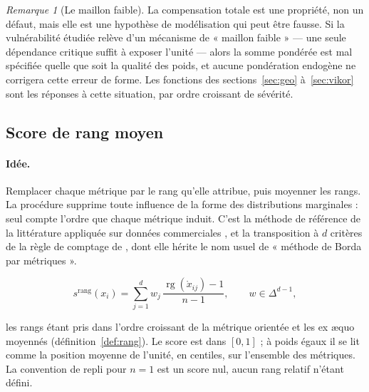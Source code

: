 \documentclass[11pt,a4paper]{article}
\theoremstyle{definition}
\theoremstyle{remark}
\newtheorem{remarque}{Remarque}[section]
\newcommand{\simplex}{\Delta^{d-1}}
\newcommand{\rg}{\operatorname{rg}}
\begin{document}
\begin{remarque}[Le maillon faible]
  \label{rem:maillon-faible}
  La compensation totale est une propriété, non un défaut, mais elle est une hypothèse
  de modélisation qui peut être fausse. Si la vulnérabilité étudiée relève d'un mécanisme
  de « maillon faible » --- une seule dépendance critique suffit à exposer l'unité ---
  alors la somme pondérée est mal spécifiée quelle que soit la qualité des poids, et
  aucune pondération endogène ne corrigera cette erreur de forme. Les fonctions des
  sections~\ref{sec:geo} à~\ref{sec:vikor} sont les réponses à cette situation, par ordre
  croissant de sévérité.
\end{remarque}

\bigskip

\subsection{Score de rang moyen}
\label{sec:rang-moyen}

\medskip

\paragraph{Idée.} Remplacer chaque métrique par le rang qu'elle attribue, puis moyenner
les rangs. La procédure supprime toute influence de la forme des distributions
marginales : seul compte l'ordre que chaque métrique induit. C'est la méthode de
référence de la littérature appliquée sur données commerciales
\citep{arjona2023}, et la transposition à $d$ critères de la règle de comptage de
\citet{borda1781}, dont elle hérite le nom usuel de « méthode de Borda par métriques ».

\medskip

\[
  s^{\mathrm{rang}}(x_i)
  = \sum_{j=1}^{d} w_j \, \frac{\rg(\mathring{x}_{ij}) - 1}{n - 1},
  \qquad w \in \simplex ,
\]

\bigskip

les rangs étant pris dans l'ordre croissant de la métrique orientée et les ex \ae quo
moyennés (définition~\ref{def:rang}). Le score est dans $[0,1]$ ; à poids égaux il se lit
comme la position moyenne de l'unité, en centiles, sur l'ensemble des métriques. La
convention de repli pour $n = 1$ est un score nul, aucun rang relatif n'étant défini.

\bigskip
\end{document}
